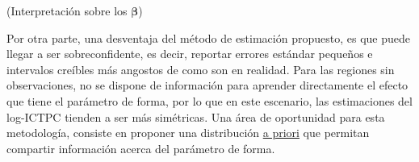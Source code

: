 \documentclass[11pt]{article}
\begin{document}
(Interpretación sobre los $\boldsymbol{\beta}$)

Por otra parte, una desventaja del método de estimación propuesto, es que puede llegar a ser sobreconfidente, es decir, reportar errores estándar pequeños e intervalos creíbles más angostos de como son en realidad. 
Para las regiones sin observaciones, no se dispone de información para aprender directamente el efecto que tiene el parámetro de forma, por lo que en este escenario, las estimaciones del log-ICTPC tienden a ser más simétricas. Una área de oportunidad para esta metodología, consiste en proponer una distribución \underline{a priori} que permitan compartir información acerca del parámetro de forma.



\end{document}
